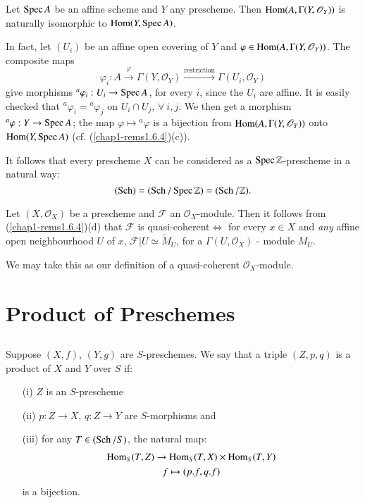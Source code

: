 \setcounter{remark}{2}
\begin{remark}\label{chap2-rem2.1.3}%
Let $\operatorname{Spec} A$ be an affine scheme and $Y$ any prescheme. Then
$\operatorname{Hom}(A,\Gamma(Y,\mathscr{O}_{Y}))$ is naturally isomorphic to
$\operatorname{Hom}(Y,\operatorname{Spec} A)$.
\end{remark}

In fact, let $(U_{i})$ be an affine open covering of $Y$ and
$\varphi\in \Hom\break (A,\Gamma(Y,\mathscr{O}_{Y}))$. The composite maps
$$
\varphi_{i}:A\xrightarrow{\varphi}\Gamma(Y,\mathscr{O}_{Y})\xrightarrow{\text{restriction}}\Gamma(U_{i},\mathscr{O}_{Y})
$$
give morphisms ${}^{a}\varphi_{i}:U_{i}\to \operatorname{Spec} A$, for every $i$,
since the $U_{i}$ are affine. It is easily checked that
${}^{a}\varphi_{i}={}^{a}\varphi_{j}$ on $U_{i}\cap U_{j}$,
$\forall\ i,j$. We then get a morphism ${}^{a}\varphi:Y\to \operatorname{Spec} A$;
the map $\varphi\mapsto{}^{a}\varphi$ is a bijection from
$\operatorname{Hom}(A,\Gamma(Y,\mathscr{O}_{Y}))$ onto $\operatorname{Hom}(Y,\operatorname{Spec} A)$
(cf. (\ref{chap1-rems1.6.4})(c)).

It follows that every prescheme $X$ can be considered as a
$\operatorname{Spec}\mathbb{Z}$-prescheme in a natural way:
$$
(\operatorname{Sch})=(\operatorname{Sch}/\operatorname{Spec}\mathbb{Z})=(\operatorname{Sch}/\mathbb{Z}).
$$

\begin{remark}\label{chap2-rem2.1.4}%
Let $(X,\mathscr{O}_{X})$ be a prescheme and $\mathscr{F}$ an
$\mathscr{O}_{X}$-module. Then it follows from (\ref{chap1-rems1.6.4})(d) that
$\mathscr{F}$ is quasi-coherent\pageoriginale $\Leftrightarrow$ for
every $x\in X$ and {\em any} affine open neighbourhood $U$ of $x$,
$\mathscr{F}|U\simeq \widetilde{M}_{U}$, for a
$\Gamma(U,\mathscr{O}_{X})$  - module $M_{U}$.
\end{remark}

We may take this as our definition of a quasi-coherent
$\mathscr{O}_{X}$-module.

\section{Product of Preschemes}\label{chap2-sec2.2}%

\setcounter{subsection}{-1}
\subsection{}\label{chap2-sec2.2.0}%

Suppose $(X,f)$, $(Y,g)$ are $S$-preschemes. We say that a triple
$(Z,p,q)$ is a product of $X$ and $Y$ over $S$ if:
\begin{itemize}
\item[(i)] $Z$ is an $S$-prescheme

\item[(ii)] $p:Z\to X$, $q:Z\to Y$ are $S$-morphisms and

\item[(iii)] for any $T\in(\operatorname{Sch}/S)$, the natural map:
\begin{gather*}
\operatorname{Hom}_{S}(T,Z)\to \operatorname{Hom}_{S}(T,X)\times \operatorname{Hom}_{S}(T,Y)\\
f\mapsto (p.f,q.f)
\end{gather*}
is a bijection.
\end{itemize}


